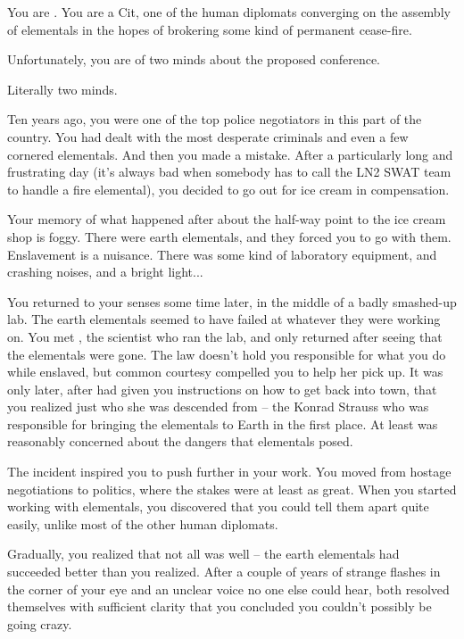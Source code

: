 \documentclass[char]{elementals}
\begin{document}
\name{\cAvatar{}}

You are \cAvatar{\intro}.  You are a Cit, one of the human diplomats converging on the assembly of elementals in the hopes of brokering some kind of permanent cease-fire.

Unfortunately, you are of two minds about the proposed conference.

Literally two minds.

Ten years ago, you were one of the top police negotiators in this part of the country.  You had dealt with the most desperate criminals and even a few cornered elementals.  And then you made a mistake.  After a particularly long and frustrating day (it's always bad when somebody has to call the LN2 SWAT team to handle a fire elemental), you decided to go out for ice cream in compensation.

Your memory of what happened after about the half-way point to the ice cream shop is foggy.  There were earth elementals, and they forced you to go with them.  Enslavement is a nuisance.  There was some kind of laboratory equipment, and crashing noises, and a bright light...

You returned to your senses some time later, in the middle of a badly smashed-up lab.  The earth elementals seemed to have failed at whatever they were working on.  You met \cGD{\intro}, the scientist who ran the lab, and only returned after seeing that the elementals were gone.  The law doesn't hold you responsible for what you do while enslaved, but common courtesy compelled you to help her pick up.  It was only later, after \cGD{\they} had given you instructions on how to get back into town, that you realized just who she was descended from -- the Konrad Strauss who was responsible for bringing the elementals to Earth in the first place.  At least \cGD{\they} was reasonably concerned about the dangers that elementals posed.

The incident inspired you to push further in your work.  You moved from hostage negotiations to politics, where the stakes were at least as great.  When you started working with elementals, you discovered that you could tell them apart quite easily, unlike most of the other human diplomats.

Gradually, you realized that not all was well -- the earth elementals had succeeded better than you realized.  After a couple of years of strange flashes in the corner of your eye and an unclear voice no one else could hear, both resolved themselves with sufficient clarity that you concluded you couldn't possibly be going crazy.
\end{document}
